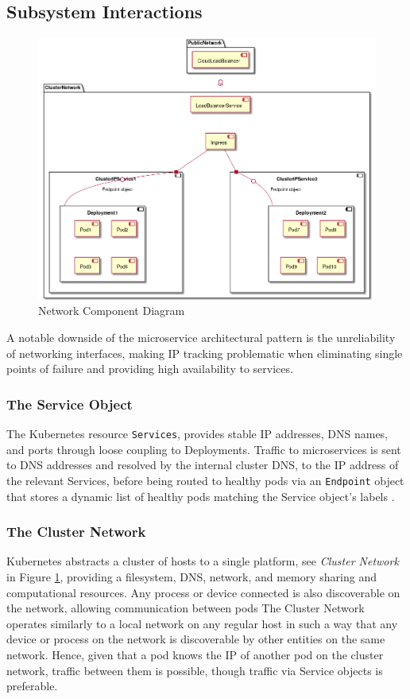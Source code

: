 \subsection{Subsystem Interactions}
\label{subsec:subsystem_interactions}
\begin{figure}[H]
    \centering
    \includegraphics[scale=.4]{images/networking-class.png}
    \caption{Network Component Diagram}
    \label{fig:network_components}
\end{figure}
A notable downside of the microservice architectural pattern is the unreliability of networking interfaces, making IP tracking problematic when eliminating single points of failure and providing high availability to services.
\subsubsection{The Service Object}
The Kubernetes resource \texttt{Services}, provides stable IP addresses, DNS names, and ports through loose coupling to Deployments.
Traffic to microservices is sent to DNS addresses and resolved by the internal cluster DNS, to the IP address of the relevant Services, before being routed to healthy pods via an \texttt{Endpoint} object that stores a dynamic list of healthy pods matching the Service object's labels \cite{k8sbook}.

\subsubsection{The Cluster Network}
Kubernetes abstracts a cluster of hosts to a single platform, see \textit{Cluster Network} in Figure \ref{fig:network_components}, providing a filesystem, DNS, network, and memory sharing and computational resources. Any process or device connected is also discoverable on the network, allowing communication between pods 
The Cluster Network operates similarly to a local network on any regular host in such a way that any device or process on the network is discoverable by other entities on the same network. 
Hence, given that a pod knows the IP of another pod on the cluster network, traffic between them is possible, though traffic via Service objects is preferable.
